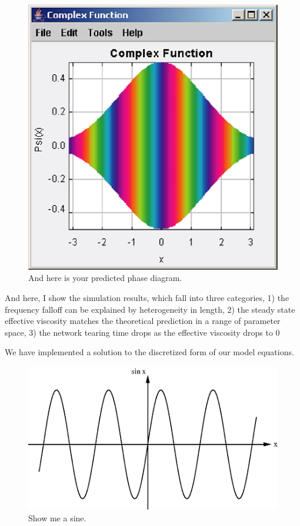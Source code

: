 \documentclass[prb,11pt]{revtex4-1}
\begin{document}
\begin{figure}[h!]
\centering
\includegraphics[scale=0.6]{phase}
\caption{\label{fig:phase}And here is your predicted phase diagram.}
\end{figure}

And here, I show the simulation results, which fall into three categories, 1) the frequency falloff can be explained by heterogeneity in length, 2) the steady state effective viscosity matches the theoretical prediction in a range of parameter space, 3) the network tearing time drops as the effective viscosity drops to 0

We have implemented a solution to the discretized form of our model equations.  

\begin{figure}[h!]
\centering
\includegraphics[scale=0.6]{sine}
\caption{\label{fig:sine}Show me a sine.}
\end{figure}
\end{document}
